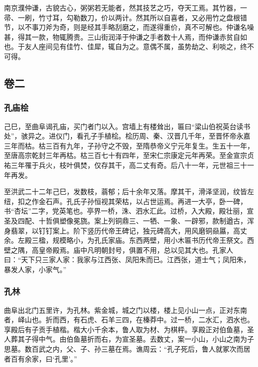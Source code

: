 \documentclass[]{article}
\begin{document}
南京濮仲谦，古貌古心，粥粥若无能者，然其技艺之巧，夺天工焉。其竹器，一帚、一刷，竹寸耳，勾勒数刀，价以两计。然其所以自喜者，又必用竹之盘根错节，以不事刀斧为奇，则是经其手略刮磨之，而遂得重价，真不可解也。仲谦名噪甚，得其一款，物辄腾贵。三山街润泽于仲谦之手者数十人焉，而仲谦赤贫自如也。于友人座间见有佳竹、佳犀，辄自为之。意偶不属，虽势劫之、利啖之，终不可得。

\hypertarget{header-n97}{%
\subsection{卷二}\label{header-n97}}

\hypertarget{header-n99}{%
\subsubsection{孔庙桧}\label{header-n99}}

己巳，至曲阜谒孔庙，买门者门以入。宫墙上有楼耸出，匾曰``梁山伯祝英台读书处''，骇异之。进仪门，看孔子手植桧。桧历周、秦、汉晋几千年，至晋怀帝永嘉三年而枯。枯三百有九年，子孙守之不毁，至隋恭帝义宁元年复生。生五十一年，至唐高宗乾封三年再枯。枯三百七十有四年，至宋仁宗康定元年再荣。至金宣宗贞祐三年罹于兵火，枝叶俱焚，仅存其干，高二丈有奇。后八十一年，元世祖三十一年再发。

至洪武二十二年己巳，发数枝，蓊郁；后十余年又落。摩其干，滑泽坚润，纹皆左纽，扣之作金石声。孔氏子孙恒视其荣枯，以占世运焉。再进一大亭，卧一碑，书``杏坛''二字，党英笔也。亭界一桥，洙、泗水汇此。过桥，入大殿，殿壮丽，宣圣及四配、十哲俱塑像冕旒。案上列铜鼎三、一牺、一象、一辟邪，款制遒古，浑身翡翠，以钉钉案上。阶下竖历代帝王碑记，独元碑高大，用风磨铜赑屭，高丈余。左殿三楹，规模略小，为孔氏家庙。东西两壁，用小木匾书历代帝王祭文。西壁之隅，高皇帝殿焉。庙中凡明朝封号，俱置不用，总以见其大也。孔家人曰：``天下只三家人家：我家与江西张、凤阳朱而已。江西张，道士气；凤阳朱，暴发人家，小家气。''

\hypertarget{header-n105}{%
\subsubsection{孔林}\label{header-n105}}

曲阜出北门五里许，为孔林。紫金城，城之门以楼，楼上见小山一点，正对东南者，峄山也。折而西，有石虎、石羊三四，在榛莽中。过一桥，二水汇，泗水也。享殿后有子贡手植楷。楷大小千余本，鲁人取为材、为棋枰。享殿正对伯鱼墓，圣人葬其子得中气。由伯鱼墓折而右，为宣圣墓。去数丈，案一小山，小山之南为子思墓。数百武之内，父、子、孙三墓在焉。谯周云：``孔子死后，鲁人就冢次而居者百有余家，曰`孔里'。''
\end{document}
